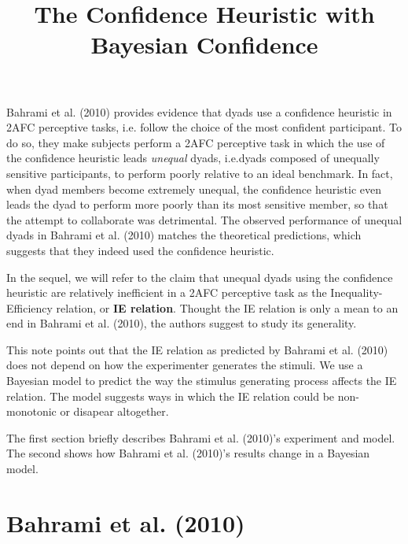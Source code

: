 \documentclass[12pt]{article}
\title{The Confidence Heuristic with Bayesian Confidence}
\author{}
\begin{document}
\maketitle






Bahrami et al. (2010) provides evidence that dyads use a confidence heuristic in 2AFC perceptive tasks, i.e. follow the choice of the most confident participant. To do so, they make subjects perform a 2AFC perceptive task in which the use of the confidence heuristic leads \textit{unequal} dyads, i.e.dyads composed of unequally sensitive participants, to perform poorly relative to an ideal benchmark. In fact, when dyad members become extremely unequal, the confidence heuristic even leads the dyad to perform more poorly than its most sensitive member, so that the attempt to collaborate was detrimental. The observed performance of unequal dyads in Bahrami et al. (2010) matches the theoretical predictions, which suggests that they indeed used the confidence heuristic. 

In the sequel, we will refer to the claim that unequal dyads using the confidence heuristic are relatively inefficient in a 2AFC perceptive task as the Inequality-Efficiency relation, or \textbf{IE relation}. Thought the IE relation is only a mean to an end in Bahrami et al. (2010), the authors suggest to study its generality. 

This note points out that the IE relation as predicted by Bahrami et al. (2010) does not depend on how the experimenter generates the stimuli. We use a Bayesian model to predict the way the stimulus generating process affects the IE relation. The model suggests ways in which the IE relation could be non-monotonic or disapear altogether. 

The first section briefly describes Bahrami et al. (2010)'s experiment and model. The second shows how Bahrami et al. (2010)'s results change in a Bayesian model.




\section{Bahrami et al. (2010)} \label{sinsights}
\end{document}
